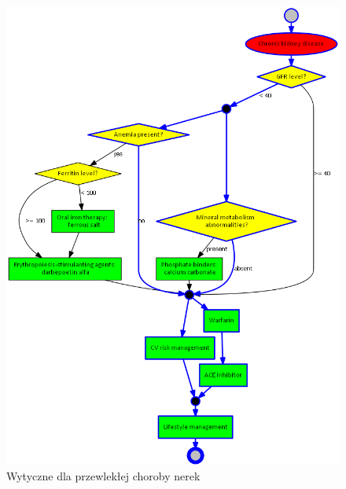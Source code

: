 \begin{figure}[H]
\centering
\includegraphics[scale=0.4]{img/rozwiazanie1ckd-simplified-ver-5_przyklad.png}
\caption{Wytyczne dla przewlekłej choroby nerek}
\label{fig:ckd_rozw}
\end{figure}